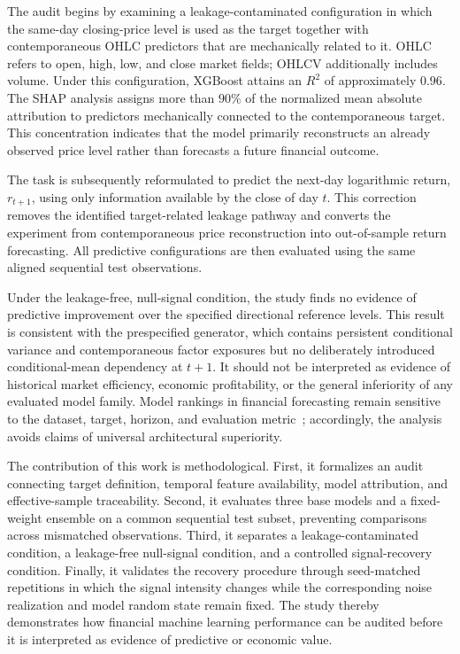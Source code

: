 \documentclass[utf8]{FrontiersinHarvard} %
\newcommand{\rev}[1]{{\color{red}#1}}
\begin{document}
The audit begins by examining a leakage-contaminated configuration in which the same-day closing-price level is used as the target together with contemporaneous OHLC predictors that are mechanically related to it. \rev{OHLC refers to open, high, low, and close market fields; OHLCV additionally includes volume.} Under this configuration, XGBoost attains an \(R^2\) of approximately \(0.96\). The SHAP analysis assigns more than \(90\%\) of the normalized mean absolute attribution to predictors mechanically connected to the contemporaneous target. This concentration indicates that the model primarily reconstructs an already observed price level rather than forecasts a future financial outcome.

The task is subsequently reformulated to predict the next-day logarithmic return, \(r_{t+1}\), using only information available by the close of day \(t\). This correction removes the identified target-related leakage pathway and converts the experiment from contemporaneous price reconstruction into out-of-sample return forecasting. All predictive configurations are then evaluated using the same aligned sequential test observations.

Under the leakage-free, null-signal condition, the study finds no evidence of predictive improvement over the specified directional reference levels. This result is consistent with the prespecified generator, which contains persistent conditional variance and contemporaneous factor exposures but no deliberately introduced conditional-mean dependency at \(t+1\). It should not be interpreted as evidence of historical market efficiency, economic profitability, or the general inferiority of any evaluated model family. Model rankings in financial forecasting remain sensitive to the dataset, target, horizon, and evaluation metric~\citep{Shobayo2025,Zhang2024review}; accordingly, the analysis avoids claims of universal architectural superiority.

The contribution of this work is methodological. First, it formalizes an audit connecting target definition, temporal feature availability, model attribution, and effective-sample traceability. Second, it evaluates three base models and a fixed-weight ensemble on a common sequential test subset, preventing comparisons across mismatched observations. Third, it separates a leakage-contaminated condition, a leakage-free null-signal condition, and a controlled signal-recovery condition. Finally, it validates the recovery procedure through seed-matched repetitions in which the signal intensity changes while the corresponding noise realization and model random state remain fixed. The study thereby demonstrates how financial machine learning performance can be audited before it is interpreted as evidence of predictive or economic value.
\end{document}
